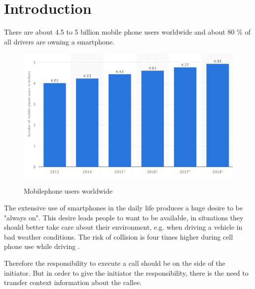 \documentclass{sigchi}
\begin{document}


\section{Introduction}
There are about 4.5 to 5 billion mobile phone users worldwide \cite{stat14} and about 80 \% of all drivers are owning a smartphone.
\begin{figure}[H]
	\centering
	\includegraphics[width=.8\linewidth]{figures/worldwide_phoneuser}
	\caption{Mobilephone users worldwide} \cite{stat14}
	\label{fig:app_worldwide}
\end{figure} The extensive use of smartphones in the daily life produces a huge desire to be "always on". This desire leads people to want to be available, in situations they should better take care about their environment, e.g. when driving a vehicle in bad weather conditions. The risk of collision is four times higher during cell phone use while driving \cite{iihs05}.

Therefore the responsibility to execute a call should be on the side of the initiator. But in order to give the initiator the responsibility, there is the need to transfer context information about the callee.
\end{document}
